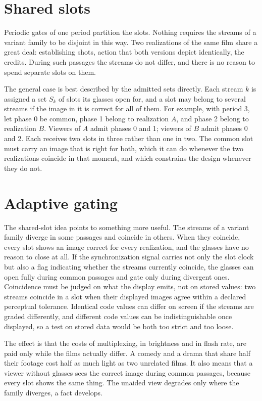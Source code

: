 \section{Shared slots}

Periodic gates of one period partition the slots. Nothing requires the streams of a variant family to be disjoint in this way. Two realizations of the same film share a great deal: establishing shots, action that both versions depict identically, the credits. During such passages the streams do not differ, and there is no reason to spend separate slots on them.

The general case is best described by the admitted sets directly. Each stream $k$ is assigned a set $S_k$ of slots its glasses open for, and a slot may belong to several streams if the image in it is correct for all of them. For example, with period 3, let phase 0 be common, phase 1 belong to realization $A$, and phase 2 belong to realization $B$. Viewers of $A$ admit phases 0 and 1; viewers of $B$ admit phases 0 and 2. Each receives two slots in three rather than one in two. The common slot must carry an image that is right for both, which it can do whenever the two realizations coincide in that moment, and which constrains the design whenever they do not.

\section{Adaptive gating}

The shared-slot idea points to something more useful. The streams of a variant family diverge in some passages and coincide in others. When they coincide, every slot shows an image correct for every realization, and the glasses have no reason to close at all. If the synchronization signal carries not only the slot clock but also a flag indicating whether the streams currently coincide, the glasses can open fully during common passages and gate only during divergent ones. Coincidence must be judged on what the display emits, not on stored values: two streams coincide in a slot when their displayed images agree within a declared perceptual tolerance. Identical code values can differ on screen if the streams are graded differently, and different code values can be indistinguishable once displayed, so a test on stored data would be both too strict and too loose.

The effect is that the costs of multiplexing, in brightness and in flash rate, are paid only while the films actually differ. A comedy and a drama that share half their footage cost half as much light as two unrelated films. It also means that a viewer without glasses sees the correct image during common passages, because every slot shows the same thing. The unaided view degrades only where the family diverges, a fact  develops.

